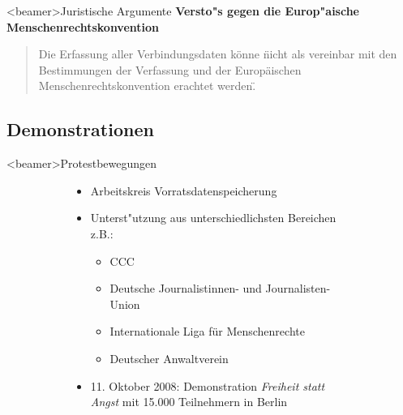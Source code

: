     \begin{frame}<beamer>{Juristische Argumente}
      \textbf{Versto"s gegen die Europ"aische Menschenrechtskonvention}
      \begin{quote}
        Die Erfassung aller Verbindungsdaten könne \"nicht als vereinbar mit den Bestimmungen der Verfassung und der Europäischen Menschenrechtskonvention erachtet werden\".

      \end{quote}
    \end{frame}

    \subsection*{Demonstrationen}
    \begin{frame}<beamer>{Protestbewegungen}
      \begin{figure}
        \begin{subfigure}[b]{0.5\textwidth}
          \begin{itemize}
            \item Arbeitskreis Vorratsdatenspeicherung
            \item Unterst"utzung aus unterschiedlichsten Bereichen z.B.:
              \begin{itemize}
                \item CCC
                \item Deutsche Journalistinnen- und Journalisten-Union
                \item Internationale Liga für Menschenrechte
                \item Deutscher Anwaltverein
              \end{itemize}
            \item 11. Oktober 2008: Demonstration {\em Freiheit statt Angst} mit 15.000 Teilnehmern in Berlin
          \end{itemize}
        \end{subfigure}
        \begin{subfigure}[b]{0.3\textwidth}

\end{subfigure}
\end{figure}
\end{frame}
